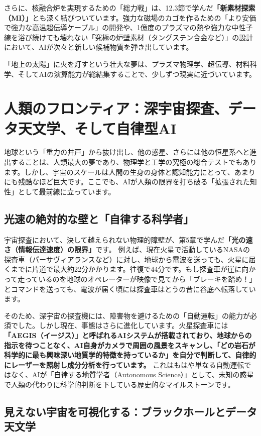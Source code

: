 さらに、核融合炉を実現するための「総力戦」は、12.3節で学んだ\textbf{「新素材探索（MI）」}とも深く結びついています。強力な磁場のカゴを作るための「より安価で強力な高温超伝導ケーブル」の開発や、1億度のプラズマの熱や強力な中性子線を浴び続けても壊れない「究極の炉壁素材（タングステン合金など）」の設計において、AIが次々と新しい候補物質を弾き出しています。

「地上の太陽」に火を灯すという壮大な夢は、プラズマ物理学、超伝導、材料科学、そしてAIの演算能力が総結集することで、少しずつ現実に近づいています。

\section{人類のフロンティア：深宇宙探査、データ天文学、そして自律型AI}

地球という「重力の井戸」から抜け出し、他の惑星、さらには他の恒星系へと進出することは、人類最大の夢であり、物理学と工学の究極の総合テストでもあります。しかし、宇宙のスケールは人間の生身の身体と認知能力にとって、あまりにも残酷なほど巨大です。ここでも、AIが人類の限界を打ち破る「拡張された知性」として最前線に立っています。

\subsection{光速の絶対的な壁と「自律する科学者」}

宇宙探査において、決して越えられない物理的障壁が、第5章で学んだ\textbf{「光の速さ（情報伝達速度）の限界」}です。 例えば、現在火星で活動しているNASAの探査車（パーサヴィアランスなど）に対し、地球から電波を送っても、火星に届くまでに片道で最大約22分かかります。往復で44分です。もし探査車が崖に向かって走っているのを地球のオペレーターが映像で見てから「ブレーキを踏め！」とコマンドを送っても、電波が届く頃には探査車はとうの昔に谷底へ転落しています。

そのため、深宇宙の探査機には、障害物を避けるための「自動運転」の能力が必須でした。しかし現在、事態はさらに進化しています。火星探査車には\textbf{「AEGIS（イージス）」と呼ばれるAIシステムが搭載されており、地球からの指示を待つことなく、AI自身がカメラで周囲の風景をスキャンし、「どの岩石が科学的に最も興味深い地質学的特徴を持っているか」を自分で判断して、自律的にレーザーを照射し成分分析を行っています。} これはもはや単なる自動運転ではなく、AIが「自律する地質学者（Autonomous Science）」として、未知の惑星で人類の代わりに科学的判断を下している歴史的なマイルストーンです。

\subsection{見えない宇宙を可視化する：ブラックホールとデータ天文学}

